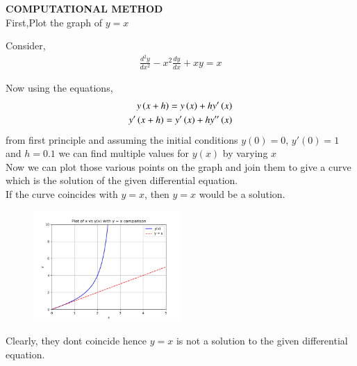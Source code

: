 \documentclass[journal]{IEEEtran}
\begin{document}
\textbf{COMPUTATIONAL METHOD}\\

First,Plot the graph of $y=x$

Consider,
\begin{align}
\frac{d^2y}{dx^2} - x^2\frac{dy}{dx} + xy = x
\end{align}

Now using the equations,
\begin{align}
    y\left(x+h\right) = y\left(x\right) + hy^{\prime}\left(x\right)\\
    y^{\prime}\left(x+h\right) = y^{\prime}\left(x\right) + hy^{\prime\prime}\left(x\right)
\end{align} 
from first principle and assuming the initial conditions $y(0) = 0$, $y'(0)=1$ and $h=0.1$ we can find multiple values for $y(x)$ by varying $x$ \\

Now we can plot those various points on the graph and join them to give a curve which is the solution of the given differential equation.\\

If the curve coincides with $y=x$, then $y=x$ would be a solution.

\begin{figure}[ht]
	\centering
	\includegraphics[width=0.5\textwidth]{figs/fig.png}
	\label{fig:Plot1}
\end{figure}

Clearly, they dont coincide hence $y=x$ is not a solution to the given differential equation.
\end{document}
